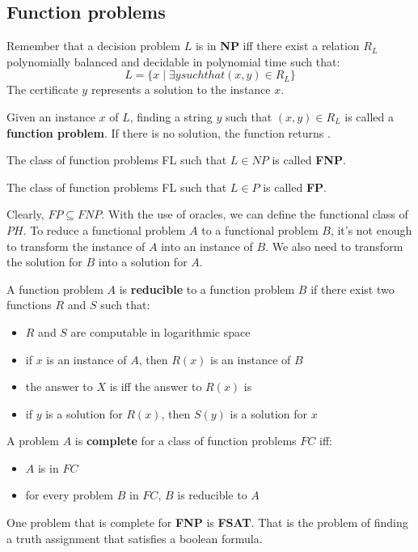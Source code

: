 \subsection{Function problems}
Remember that a decision problem $L$ is in \textbf{NP} iff there exist a relation $R_L$ polynomially balanced and decidable in polynomial time such that:
$$
L=\{x\;|\; \exists y such that (x,y)\in R_L\}
$$
The certificate $y$ represents a solution to the instance $x$.
\begin{defbox}
    Given an instance $x$ of $L$, finding a string $y$ such that $(x,y)\in R_L$ is called a \textbf{function problem}. If there is no solution, the function returns .
\end{defbox}
\begin{defbox}[FNP]
    The class of function problems FL such that $L\in NP$ is called \textbf{FNP}. 
\end{defbox}
\begin{defbox}[FP]
    The class of function problems FL such that $L\in P$ is called \textbf{FP}.
\end{defbox}
Clearly, $FP\subseteq FNP$. With the use of oracles, we can define the functional class of $PH$.
To reduce a functional problem $A$ to a functional problem $B$, it's not enough to transform the instance of $A$ into an instance of $B$. We also need to transform the solution for $B$ into a solution for $A$. 
\begin{defbox}
    A function problem $A$ is \textbf{reducible} to a function problem $B$ if there exist two functions $R$ and $S$ such that:
    \begin{itemize}
        \item $R$ and $S$ are computable in logarithmic space
        \item if $x$ is an instance of $A$, then $R(x)$ is an instance of $B$
        \item the answer to $X$ is  iff the answer to $R(x)$ is 
        \item if $y$ is a solution for $R(x)$, then $S(y)$ is a solution for $x$
    \end{itemize}
\end{defbox}
\begin{defbox}
    A problem $A$ is \textbf{complete} for a class of function problems $FC$ iff:
    \begin{itemize}
        \item $A$ is in $FC$
        \item for every problem $B$ in $FC$, $B$ is reducible to $A$
    \end{itemize}
\end{defbox}
One problem that is complete for \textbf{FNP} is \textbf{FSAT}.
That is the problem of finding a truth assignment that satisfies a boolean formula.

